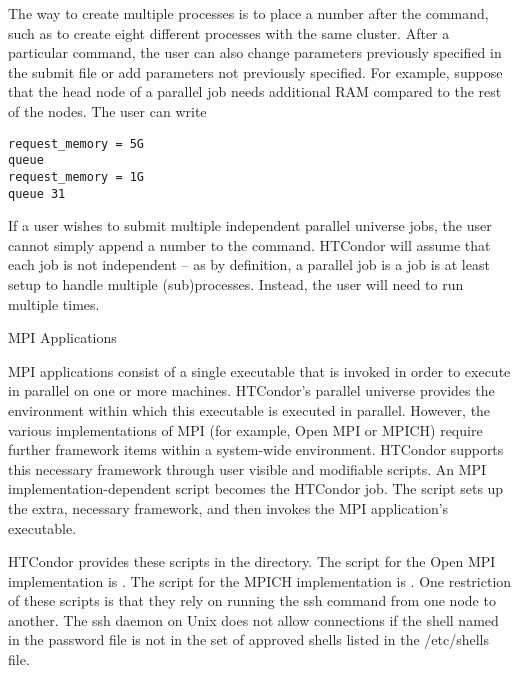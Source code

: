 The way to create multiple processes is to place a number after the 
command, such as  to create eight different processes with the 
same cluster. After a particular  command, the user can also change 
parameters previously specified in the submit file or add parameters not 
previously specified. For example, suppose that the head node of a parallel job 
needs additional RAM compared to the rest of the nodes. The user can write

\begin{verbatim}
request_memory = 5G
queue
request_memory = 1G
queue 31
\end{verbatim}

If a user wishes to submit multiple independent parallel universe jobs, the 
user cannot simply append a number to the  command. HTCondor will 
assume that each job is not independent -- as by definition, a parallel job is a 
job is at least setup to handle multiple (sub)processes. Instead, the user will
need to run  multiple times.

\label{sec:parallel-mpi-submit}
\begin{description}
\item[MPI Applications]
\end{description}


MPI applications consist of a single executable that is invoked in order to
execute in parallel on one or more machines. 
HTCondor's parallel universe provides the environment within
which this executable is executed in parallel.
However, the various implementations of MPI
(for example, Open MPI or MPICH) require further framework items within
a system-wide environment.
HTCondor supports this necessary framework through 
user visible and modifiable scripts.
An MPI implementation-dependent script becomes the HTCondor job.
The script sets up the extra, necessary framework,
and then invokes the MPI application's executable.

HTCondor provides these scripts in the
directory.
The script for the Open MPI implementation is .
The script for the MPICH implementation is .
One restriction of these scripts is that they rely on running
the ssh command from one node to another.  The ssh daemon 
on Unix does not allow connections if the shell named in
the password file is not in the set of approved shells
listed in the /etc/shells file.

